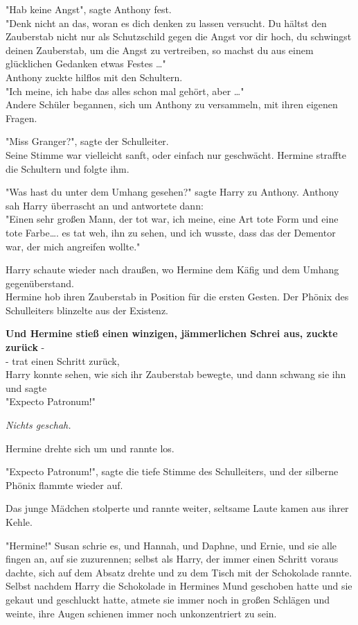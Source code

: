 {"Hab keine Angst", sagte Anthony fest.\\ "Denk nicht an das, woran es dich denken zu lassen versucht. Du hältst den Zauberstab nicht nur als Schutzschild gegen die Angst vor dir hoch, du schwingst deinen Zauberstab, um die Angst zu vertreiben, so machst du aus einem glücklichen Gedanken etwas Festes …"\\ Anthony zuckte hilflos mit den Schultern.\\ "Ich meine, ich habe das alles schon mal gehört, aber …"\\ Andere Schüler begannen, sich um Anthony zu versammeln, mit ihren eigenen Fragen.

"Miss Granger?", sagte der Schulleiter.\\ Seine Stimme war vielleicht sanft, oder einfach nur geschwächt. Hermine straffte die Schultern und folgte ihm.

"Was hast du unter dem Umhang gesehen?" sagte Harry zu Anthony. Anthony sah Harry überrascht an und antwortete dann:\\ "Einen sehr großen Mann, der tot war, ich meine, eine Art tote Form und eine tote Farbe…. es tat weh, ihn zu sehen, und ich wusste, dass das der Dementor war, der mich angreifen wollte."

Harry schaute wieder nach draußen, wo Hermine dem Käfig und dem Umhang gegenüberstand.\\ Hermine hob ihren Zauberstab in Position für die ersten Gesten. Der Phönix des Schulleiters blinzelte aus der Existenz.

\textbf{Und Hermine stieß einen winzigen, jämmerlichen Schrei aus, zuckte zurück} -\\ - trat einen Schritt zurück,\\ Harry konnte sehen, wie sich ihr Zauberstab bewegte, und dann schwang sie ihn und sagte\\ "Expecto Patronum!"

\emph{Nichts geschah.}

Hermine drehte sich um und rannte los.

"Expecto Patronum!", sagte die tiefe Stimme des Schulleiters, und der silberne Phönix flammte wieder auf.

Das junge Mädchen stolperte und rannte weiter, seltsame Laute kamen aus ihrer Kehle.

"Hermine!" Susan schrie es, und Hannah, und Daphne, und Ernie, und sie alle fingen an, auf sie zuzurennen; selbst als Harry, der immer einen Schritt voraus dachte, sich auf dem Absatz drehte und zu dem Tisch mit der Schokolade rannte. Selbst nachdem Harry die Schokolade in Hermines Mund geschoben hatte und sie gekaut und geschluckt hatte, atmete sie immer noch in großen Schlägen und weinte, ihre Augen schienen immer noch unkonzentriert zu sein.

}
